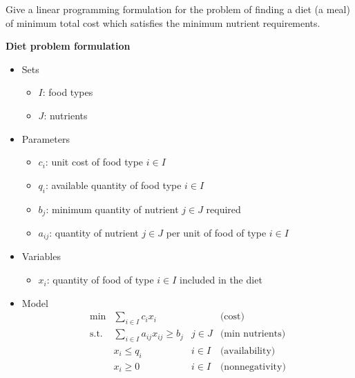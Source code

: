 \noindent
Give a linear programming formulation for the problem of finding a diet (a meal) of minimum total cost which satisfies the minimum nutrient requirements.

\highspace
\begin{flushleft}
    \textcolor{Green3}{ \textbf{Diet problem formulation}}
\end{flushleft}
\begin{itemize}
    \item Sets
    \begin{itemize}
        \item $I$: food types
        \item $J$: nutrients
    \end{itemize}

    \item Parameters
    \begin{itemize}
        \item $c_{i}$: unit cost of food type $i \in I$ 
        \item $q_{i}$: available quantity of food type $i \in I$
        \item $b_{j}$: minimum quantity of nutrient $j \in J$ required
        \item $a_{ij}$: quantity of nutrient $j \in J$ per unit of food of type $i \in I$
    \end{itemize}

    \newpage

    \item Variables
    \begin{itemize}
        \item $x_i$: quantity of food of type $i \in I$ included in the diet
    \end{itemize}

    \item Model
    \begin{equation*}
        \begin{array}{llll}
            \min & \displaystyle\sum_{i\in I} c_{i} x_{i} \qquad & & \text{(cost)} \\ [1.4em]
            \text{s.t.} & \displaystyle\sum_{i\in I}a_{ij}x_{ij} \ge b_j & j \in J & \text{(min nutrients)} \\ [1.4em]
            & x_i \leq q_i & i \in I & \text{(availability)} \\ [.5em]
            & x_i \geq 0 &  i \in I & \text{(nonnegativity)}
        \end{array}
    \end{equation*}
\end{itemize}

